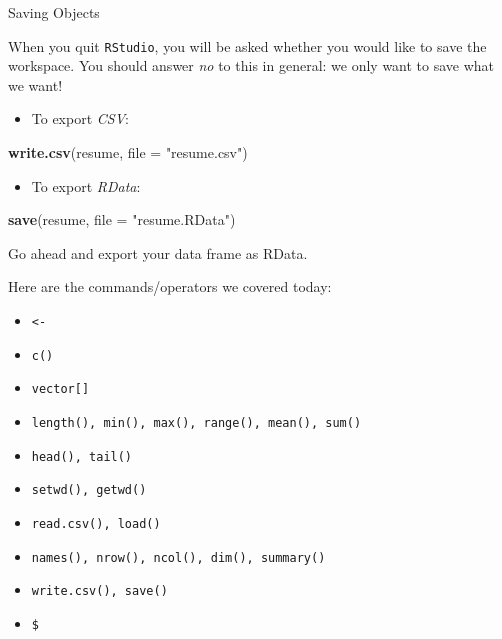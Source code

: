 \documentclass[ignorenonframetext,]{beamer}
\newenvironment{Shaded}{\begin{snugshade}}{\end{snugshade}}
\newcommand{\KeywordTok}[1]{\textcolor[rgb]{0.13,0.29,0.53}{\textbf{#1}}}
\newcommand{\DataTypeTok}[1]{\textcolor[rgb]{0.13,0.29,0.53}{#1}}
\newcommand{\StringTok}[1]{\textcolor[rgb]{0.31,0.60,0.02}{#1}}
\newcommand{\NormalTok}[1]{#1}
\providecommand{\tightlist}{%
	\setlength{\itemsep}{0pt}\setlength{\parskip}{0pt}}
\begin{document}
\begin{frame}[fragile]{Saving Objects}

When you quit \texttt{RStudio}, you will be asked whether you would like
to save the workspace. You should answer \emph{no} to this in general:
we only want to save what we want!

\begin{itemize}
\tightlist
\item
  To export \emph{CSV}:
\end{itemize}

\begin{Shaded}
\begin{Highlighting}[]
\KeywordTok{write.csv}\NormalTok{(resume, }\DataTypeTok{file =} \StringTok{"resume.csv"}\NormalTok{)}
\end{Highlighting}
\end{Shaded}

\begin{itemize}
\tightlist
\item
  To export \emph{RData}:
\end{itemize}

\begin{Shaded}
\begin{Highlighting}[]
\KeywordTok{save}\NormalTok{(resume, }\DataTypeTok{file =} \StringTok{"resume.RData"}\NormalTok{)}
\end{Highlighting}
\end{Shaded}

Go ahead and export your data frame as RData.

\end{frame}

\begin{frame}[fragile]{Here are the commands/operators we covered
today:}

\begin{itemize}
\tightlist
\item
  \texttt{\textless{}-}
\item
  \texttt{c()}
\item
  \texttt{vector{[}{]}}
\item
  \texttt{length(),\ min(),\ max(),\ range(),\ mean(),\ sum()}
\item
  \texttt{head(),\ tail()}
\item
  \texttt{setwd(),\ getwd()}
\item
  \texttt{read.csv(),\ load()}
\item
  \texttt{names(),\ nrow(),\ ncol(),\ dim(),\ summary()}
\item
  \texttt{write.csv(),\ save()}
\item
  \texttt{\$}
\end{itemize}

\end{frame}
\end{document}
